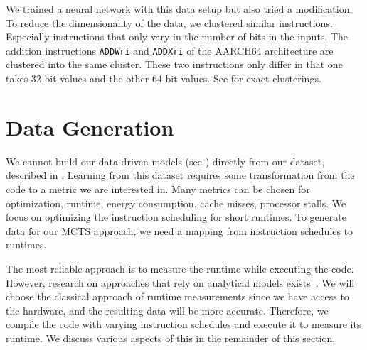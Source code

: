 We trained a neural network with this data setup but also tried a modification.
To reduce the dimensionality of the data, we clustered similar instructions.
Especially instructions that only vary in the number of bits in the inputs.
The addition instructions \lstinline|ADDWri| and \lstinline|ADDXri| of the AARCH64 architecture are clustered into the same cluster.
These two instructions only differ in that one takes 32-bit values and the other 64-bit values.
See  for exact clusterings.

\section{Data Generation}
\tobechecked
We cannot build our data-driven models (see ) directly from our dataset, described in .
Learning from this dataset requires some transformation from the code to a metric we are interested in.
Many metrics can be chosen for optimization, \eg runtime, energy consumption, cache misses, processor stalls.
We focus on optimizing the instruction scheduling for short runtimes.
To generate data for our MCTS approach, we need a mapping from instruction schedules to runtimes.

The most reliable approach is to measure the runtime while executing the code.
However, research on approaches that rely on analytical models exists~\cite{llvm:mca, mendis2019ithemal, taha2003instruction, laukemann2018automated}.
We will choose the classical approach of runtime measurements since we have access to the hardware, and the resulting data will be more accurate.
Therefore, we compile the code with varying instruction schedules and execute it to measure its runtime.
We discuss various aspects of this in the remainder of this section.

